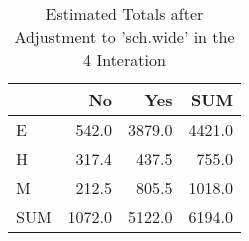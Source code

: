\begin{table}[ht]
\centering
\caption{Estimated Totals after Adjustment to 'sch.wide' in the 4 Interation} 
\begin{tabular}{l|rr|r}
  & No & Yes & SUM \\ 
  \hline
E & 542.0 & 3879.0 & 4421.0 \\ 
  H & 317.4 & 437.5 & 755.0 \\ 
  M & 212.5 & 805.5 & 1018.0 \\ 
   \hline
SUM & 1072.0 & 5122.0 & 6194.0 \\ 
  \end{tabular}
\end{table}
